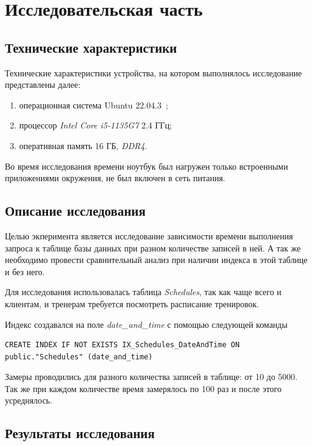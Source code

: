 \chapter{Исследовательская часть}

\section{Технические характеристики}

Технические характеристики устройства, на котором выполнялось исследование представлены далее:
\begin{enumerate}[label=\arabic*)]
	\item операционная система Ubuntu 22.04.3~\cite{ubuntu};
	\item процессор \textit{Intel Core i5-1135G7} 2.4 ГГц;
	\item оперативная память 16 ГБ, \textit{DDR4}.
\end{enumerate}

Во время исследования времени ноутбук был нагружен только встроенными приложениями окружения, не был включен в сеть питания.

\section{Описание исследования}

Целью экперимента является исследование зависимости времени выполнения запроса к таблице базы данных при разном количестве записей в ней. А так же необходимо провести сравнительный анализ при наличии индекса в этой таблице и без него.

Для исследования использовалась таблица \textit{Schedules}, так как чаще всего и клиентам, и тренерам требуется посмотреть расписание тренировок.

Индекс создавался на поле \textit{date\_and\_time} с помощью следующей команды

\begin{lstlisting}
CREATE INDEX IF NOT EXISTS IX_Schedules_DateAndTime ON public."Schedules" (date_and_time)
\end{lstlisting}

Замеры проводились для разного количества записей в таблице: от 10 до 5000. Так же при каждом количестве время замерялось по 100 раз и после этого усреднялось.
\clearpage

\section{Результаты исследования}


